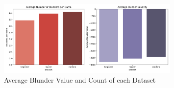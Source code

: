 













\begin{figure}
    \centering
    \includegraphics[width=0.8\textwidth]{images/plots/dataset/Dataset_vs_blunder_value_and_count.png}
    \caption{Average Blunder Value and Count of each Dataset}
    \label{fig: dataset_vs_blunder_value_and_count}
\end{figure}


